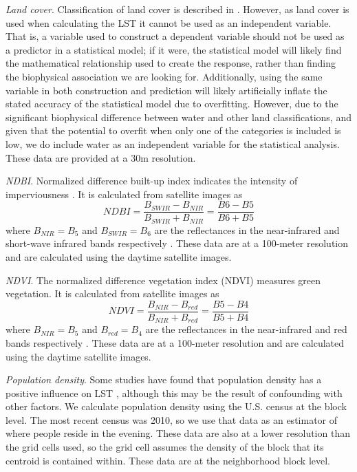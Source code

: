 \documentclass[final,3p,times,onecolumn,sort&compress]{elsarticle}
\begin{document}
\textit{Land cover}. 
Classification of land cover is described in \citep{Homer2015-ce}. 
However, as land cover is used when calculating the LST it cannot be used as an independent variable.
That is, a variable used to construct a dependent variable should not be used as a predictor in a statistical model; 
if it were, the statistical model will likely find the mathematical relationship used to create the response, rather than finding the biophysical association we are looking for. 
Additionally, using the same variable in both construction and prediction will likely artificially inflate the stated accuracy of the statistical model due to overfitting.
However, due to the significant biophysical difference between water and other land classifications, and given that the potential to overfit when only one of the categories is included is low, we do include water as an independent variable for the statistical analysis.
These data are provided at a 30m resolution.

\textit{NDBI}. 
Normalized difference built-up index indicates the intensity of imperviousness \citep{Bhatti2014-ae}. 
It is calculated from satellite images as 
\begin{equation}
    \label{eqn:ndbi}
    NDBI = \frac{B_{SWIR}-B_{NIR}}{B_{SWIR}+B_{NIR}} = \frac{B6-B5}{B6+B5}
\end{equation}
where $B_{NIR}=B_5$ and $B_{SWIR}=B_6$ are the reflectances in the near-infrared and short-wave infrared bands respectively \citep{Alhawiti2016-wv, barsi2014}.
These data are at a 100-meter resolution and are calculated using the daytime satellite images.

\textit{NDVI}. 
The normalized difference vegetation index (NDVI) measures green vegetation. 
It is calculated from satellite images as 
\begin{equation}
    \label{eqn:ndvi}
    NDVI = \frac{B_{NIR}-B_{red}}{B_{NIR}+B_{red}} = \frac{B5-B4}{B5+B4}
\end{equation}
where $B_{NIR} = B_5$ and $B_{red} = B_4$ are the reflectances in the near-infrared and red bands respectively \citep{Alhawiti2016-wv, barsi2014}.
These data are at a 100-meter resolution and are calculated using the daytime satellite images.

\textit{Population density}. 
Some studies have found that population density has a positive influence on LST \citep{Li2017-yl, Peng2018-cp}, although this may be the result of confounding with other factors. 
We calculate population density using the U.S. census at the block level. 
The most recent census was 2010, so we use that data as an estimator of where people reside in the evening. 
These data are also at a lower resolution than the grid cells used, so the grid cell assumes the density of the block that its centroid is contained within.
These data are at the neighborhood block level.
\end{document}
